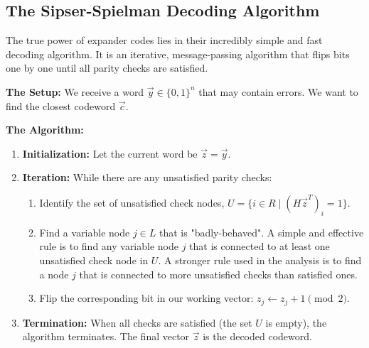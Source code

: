 \subsection{The Sipser-Spielman Decoding Algorithm}

The true power of expander codes lies in their incredibly simple and fast decoding algorithm. It is an iterative, message-passing algorithm that flips bits one by one until all parity checks are satisfied.

\textbf{The Setup:} We receive a word $\vec{y} \in \{0,1\}^n$ that may contain errors. We want to find the closest codeword $\vec{c}$.

\textbf{The Algorithm:}
\begin{enumerate}
    \item \textbf{Initialization:} Let the current word be $\vec{z} = \vec{y}$.
    \item \textbf{Iteration:} While there are any unsatisfied parity checks:
    \begin{enumerate}
        \item Identify the set of unsatisfied check nodes, $U = \{i \in R \mid (H\vec{z}^T)_i = 1\}$.
        \item Find a variable node $j \in L$ that is "badly-behaved". A simple and effective rule is to find any variable node $j$ that is connected to at least one unsatisfied check node in $U$. A stronger rule used in the analysis is to find a node $j$ that is connected to more unsatisfied checks than satisfied ones.
        \item Flip the corresponding bit in our working vector: $z_j \leftarrow z_j + 1 \pmod{2}$.
    \end{enumerate}
    \item \textbf{Termination:} When all checks are satisfied (the set $U$ is empty), the algorithm terminates. The final vector $\vec{z}$ is the decoded codeword.
\end{enumerate}


